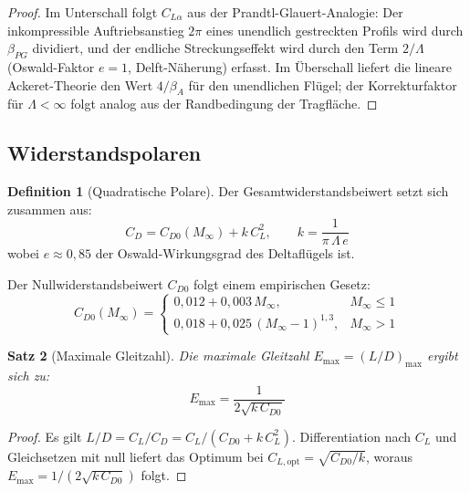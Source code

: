﻿\documentclass[12pt,a4paper]{article}
\theoremstyle{plain}
\newtheorem{theorem}{Satz}[section]
\theoremstyle{definition}
\newtheorem{definition}[theorem]{Definition}
\theoremstyle{remark}
\begin{document}
\begin{proof}
  Im Unterschall folgt $C_{L\alpha}$ aus der Prandtl-Glauert-Analogie:
  Der inkompressible Auftriebsanstieg $2\pi$ eines unendlich gestreckten Profils
  wird durch $\beta_{PG}$ dividiert, und der endliche Streckungseffekt wird durch
  den Term $2/\Lambda$ (Oswald-Faktor $e=1$, Delft-Näherung) erfasst.
  Im Überschall liefert die lineare Ackeret-Theorie den Wert $4/\beta_A$ für
  den unendlichen Flügel; der Korrekturfaktor für $\Lambda < \infty$ folgt
  analog aus der Randbedingung der Tragfläche.
\end{proof}

\subsection{Widerstandspolaren}

\begin{definition}[Quadratische Polare]
  Der Gesamtwiderstandsbeiwert setzt sich zusammen aus:
  \begin{equation}
    C_D = C_{D0}(M_\infty) + k\,C_L^2, \qquad
    k = \frac{1}{\pi\,\Lambda\,e}
    \label{eq:polar}
  \end{equation}
  wobei $e \approx 0{,}85$ der Oswald-Wirkungsgrad des Deltaflügels ist.
\end{definition}

Der Nullwiderstandsbeiwert $C_{D0}$ folgt einem empirischen Gesetz:
\begin{equation}
  C_{D0}(M_\infty) =
  \begin{cases}
    0{,}012 + 0{,}003\,M_\infty, & M_\infty \leq 1 \\
    0{,}018 + 0{,}025\,(M_\infty - 1)^{1{,}3}, & M_\infty > 1
  \end{cases}
  \label{eq:cd0}
\end{equation}

\begin{theorem}[Maximale Gleitzahl]
  Die maximale Gleitzahl $E_{\max} = (L/D)_{\max}$ ergibt sich zu:
  \begin{equation}
    E_{\max} = \frac{1}{2\sqrt{k\,C_{D0}}}
    \label{eq:ldmax}
  \end{equation}
\end{theorem}

\begin{proof}
  Es gilt $L/D = C_L/C_D = C_L / (C_{D0} + k\,C_L^2)$.
  Differentiation nach $C_L$ und Gleichsetzen mit null liefert das Optimum
  bei $C_{L,\text{opt}} = \sqrt{C_{D0}/k}$, woraus $E_{\max} = 1/(2\sqrt{k\,C_{D0}})$
  folgt.
\end{proof}
\end{document}
